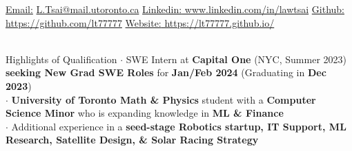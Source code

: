 \documentclass[UTF8]{resume} %
\begin{document}
  \scriptsize\underline{Email:}
            \href{L.Tsai@mail.utoronto.ca}{L.Tsai@mail.utoronto.ca}     {  }
            {\scriptsize\underline{Linkedin:}}\href{https://www.linkedin.com/in/lawtsai}{ www.linkedin.com/in/lawtsai}
            {        }
           {\scriptsize\underline{Github:}}\href{https://github.com/lt77777}{ https://github.com/lt77777}
           {        }
           {\scriptsize\underline{Website:}}\href{https://lt77777.github.io/}{ https://lt77777.github.io/}\\
~\vspace{-0.6cm}


\begin{rSection}{Highlights of Qualification}
    \scriptsize{
    $\cdot$ SWE Intern at \textbf{Capital One} (NYC, Summer 2023) \textbf{seeking New Grad SWE Roles} for \textbf{Jan/Feb 2024} (Graduating in \textbf{Dec 2023}) \\
    $\cdot$ \textbf{University of Toronto Math \& Physics} student with a \textbf{Computer Science Minor} who is expanding knowledge in \textbf{ML \& Finance}\\
    $\cdot$ Additional experience in a \textbf{seed-stage Robotics startup, IT Support, ML Research, Satellite Design, \& Solar Racing Strategy}
    }
\end{rSection}
\end{document}
